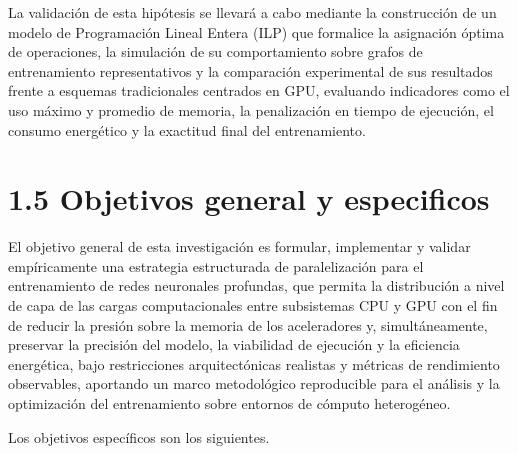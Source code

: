 La validación de esta hipótesis se llevará a cabo mediante la construcción de un modelo de Programación Lineal Entera (ILP) que formalice la asignación óptima de operaciones, la simulación de su comportamiento sobre grafos de entrenamiento representativos y la comparación experimental de sus resultados frente a esquemas tradicionales centrados en GPU, evaluando indicadores como el uso máximo y promedio de memoria, la penalización en tiempo de ejecución, el consumo energético y la exactitud final del entrenamiento.

\section{1.5 Objetivos general y especificos}
El objetivo general de esta investigación es formular, implementar y validar empíricamente una estrategia estructurada de paralelización para el entrenamiento de redes neuronales profundas, que permita la distribución a nivel de capa de las cargas computacionales entre subsistemas CPU y GPU con el fin de reducir la presión sobre la memoria de los aceleradores y, simultáneamente, preservar la precisión del modelo, la viabilidad de ejecución y la eficiencia energética, bajo restricciones arquitectónicas realistas y métricas de rendimiento observables, aportando un marco metodológico reproducible para el análisis y la optimización del entrenamiento sobre entornos de cómputo heterogéneo.

Los objetivos específicos son los siguientes.

